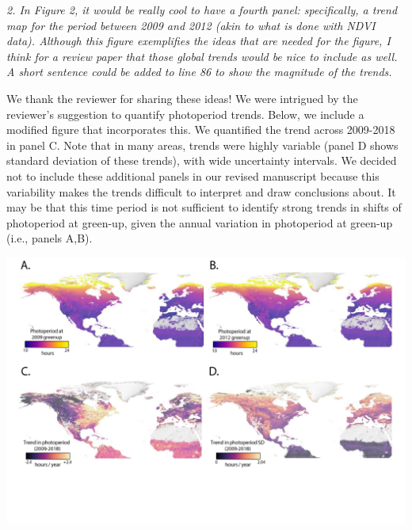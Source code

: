 \documentclass{article}
\begin{document}
\par \emph{2. In Figure 2, it would be really cool to have a fourth panel: specifically, a trend map for the period between 2009 and 2012 (akin to what is done with NDVI data). Although this figure exemplifies the ideas that are needed for the figure, I think for a review paper that those global trends would be nice to include as well. A short sentence could be added to line 86 to show the magnitude of the trends. }
\par We thank the reviewer for sharing these ideas!  We were intrigued by the reviewer's suggestion to quantify photoperiod trends. Below, we include a modified figure that incorporates this. We quantified the trend across 2009-2018 in panel C. Note that in many areas, trends were highly variable (panel D shows standard deviation of these trends), with wide uncertainty intervals. We decided not to include these additional panels in our revised manuscript because this variability makes the trends difficult to interpret and draw conclusions about. It may be that this time period is not sufficient to identify strong trends in shifts of photoperiod at green-up, given the annual variation in photoperiod at green-up (i.e., panels A,B).
\par
\includegraphics{../figures/Greenup_corr_sm_leg_4panels_sds.pdf} %
\end{document}
